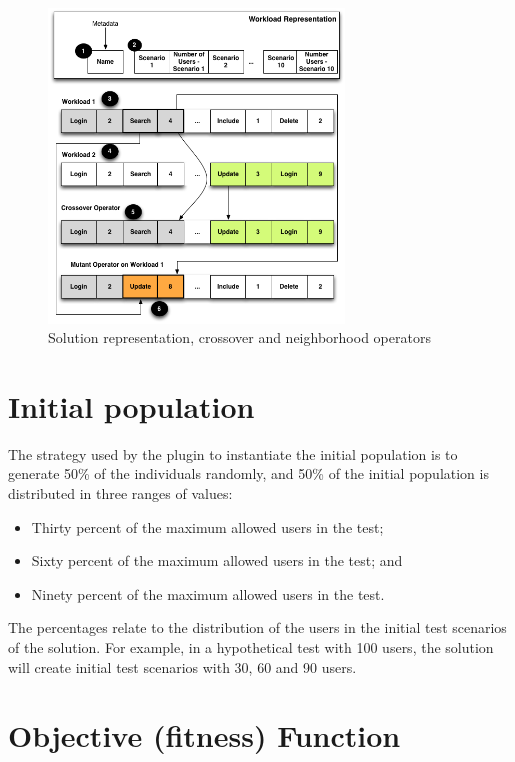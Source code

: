 \documentclass[espaco=umemeio,chapter=TITLE,twoside,openright]{abnt}
\begin{document}
\begin{figure}[h]
\centering
\includegraphics[width=0.7\textwidth]{./images/genomere.png}
\caption{Solution representation, crossover  and neighborhood operators \cite{Gois2016}}
\label{fig:solution}
\end{figure}

\section{Initial population}

The strategy used by the plugin to instantiate the initial population is to generate 50\% of the individuals randomly, and 50\% of the initial population is distributed in three ranges of values:

\begin{itemize}
\item Thirty percent of the maximum allowed users in the test;
\item Sixty percent of the maximum allowed users in the test; and
\item Ninety percent of the maximum allowed users in the test.
\end{itemize}

The percentages relate to the distribution of the users in the initial test scenarios of the solution. For example, in a hypothetical test with 100 users, the solution will create initial test scenarios with 30, 60 and 90 users.

\section{Objective (fitness) Function}
\end{document}
